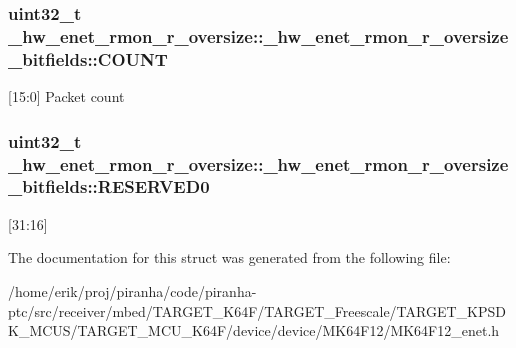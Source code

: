 \subsubsection[{\texorpdfstring{C\+O\+U\+NT}{COUNT}}]{\setlength{\rightskip}{0pt plus 5cm}uint32\+\_\+t \+\_\+hw\+\_\+enet\+\_\+rmon\+\_\+r\+\_\+oversize\+::\+\_\+hw\+\_\+enet\+\_\+rmon\+\_\+r\+\_\+oversize\+\_\+bitfields\+::\+C\+O\+U\+NT}\hypertarget{struct__hw__enet__rmon__r__oversize_1_1__hw__enet__rmon__r__oversize__bitfields_a41f13c914ffedbb14805507508b30aca}{}\label{struct__hw__enet__rmon__r__oversize_1_1__hw__enet__rmon__r__oversize__bitfields_a41f13c914ffedbb14805507508b30aca}
\mbox{[}15\+:0\mbox{]} Packet count 
\subsubsection[{\texorpdfstring{R\+E\+S\+E\+R\+V\+E\+D0}{RESERVED0}}]{\setlength{\rightskip}{0pt plus 5cm}uint32\+\_\+t \+\_\+hw\+\_\+enet\+\_\+rmon\+\_\+r\+\_\+oversize\+::\+\_\+hw\+\_\+enet\+\_\+rmon\+\_\+r\+\_\+oversize\+\_\+bitfields\+::\+R\+E\+S\+E\+R\+V\+E\+D0}\hypertarget{struct__hw__enet__rmon__r__oversize_1_1__hw__enet__rmon__r__oversize__bitfields_a422cbef2757715bc92d70eeb3abb67cb}{}\label{struct__hw__enet__rmon__r__oversize_1_1__hw__enet__rmon__r__oversize__bitfields_a422cbef2757715bc92d70eeb3abb67cb}
\mbox{[}31\+:16\mbox{]} 

The documentation for this struct was generated from the following file\+:\begin{DoxyCompactItemize}
\item 
/home/erik/proj/piranha/code/piranha-\/ptc/src/receiver/mbed/\+T\+A\+R\+G\+E\+T\+\_\+\+K64\+F/\+T\+A\+R\+G\+E\+T\+\_\+\+Freescale/\+T\+A\+R\+G\+E\+T\+\_\+\+K\+P\+S\+D\+K\+\_\+\+M\+C\+U\+S/\+T\+A\+R\+G\+E\+T\+\_\+\+M\+C\+U\+\_\+\+K64\+F/device/device/\+M\+K64\+F12/M\+K64\+F12\+\_\+enet.\+h\end{DoxyCompactItemize}
